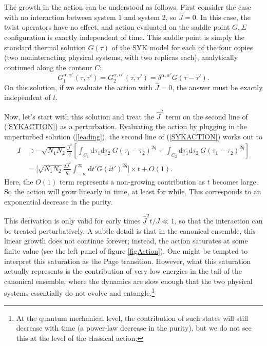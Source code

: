 \documentclass[11pt]{article}
\newcommand{\be}{\begin{equation}}
\newcommand{\ee}{\end{equation}}
\numberwithin{equation}{section}
\begin{document}
The growth in the action can be understood as follows. First consider the case with no interaction between system 1 and system 2, so $\widehat{J} = 0$. In this case, the twist operators have no effect, and action evaluated on the saddle point $G,\Sigma$ configuration is exactly independent of time. This saddle point is simply the standard thermal solution $G(\tau)$ of the SYK model for each of the four copies (two noninteracting physical systems, with two replicas each), analytically continued along the contour $C$:
	\be
G^{\alpha,\alpha'}_1(\tau,\tau') = G^{\alpha,\alpha'}_2(\tau,\tau') = \delta^{\alpha,\alpha'}G(\tau-\tau').\label{leading}
	\ee
On this solution, if we evaluate the action with $\widehat{J} = 0$, the answer must be exactly independent of $t$.

Now, let's start with this solution and treat the $\hat{J}^2$ term on the second line of (\ref{SYKACTION}) as a perturbation. Evaluating the action by plugging in the unperturbed solution (\ref{leading}), the second line of (\ref{SYKACTION}) works out to
	\begin{align}
I &\supset -\sqrt{N_1N_2}\frac{\hat{J}^2}{q}\left[\int_{C_1}\mathrm{d}\tau_1\mathrm{d}\tau_2  \ G(\tau_1-\tau_2)^{2\hat{q}} + \int_{C_2}\mathrm{d}\tau_1\mathrm{d}\tau_2  \ G(\tau_1-\tau_2)^{2\hat{q}}\right] \\
& = \bigg[\sqrt{N_1N_2}\frac{2\hat{J}^2}{q}\int_{-\infty}^\infty \mathrm{d}t' G(it')^{2\hat{q}}\bigg] \times t + O(1).\label{INITIAL}
	\end{align}
	Here, the $O(1)$ term represents a non-growing contribution as $t$ becomes large. So the action will grow linearly in time, at least for while. This corresponds to an exponential decrease in the purity.

This derivation is only valid for early times $\widehat{J}^2t/J \ll 1$, so that the interaction can be treated perturbatively. A subtle detail \cite{Gu:2017njx} is that in the canonical ensemble, this linear growth does not continue forever; instead, the action saturates at some finite value (see the left panel of figure \ref{figAction}). One might be tempted to interpret this saturation as the Page transition. However, what this saturation actually represents is the contribution of very low energies in the tail of the canonical ensemble, where the dynamics are slow enough that the two physical systems essentially do not evolve and entangle.\footnote{At the quantum mechanical level, the contribution of such states will still decrease with time (a power-law decrease in the purity), but we do not see this at the level of the classical action.}
\end{document}
